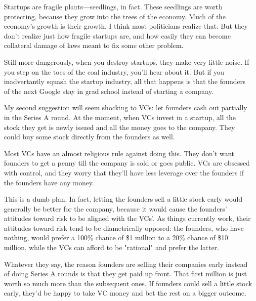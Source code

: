 Startups are
                  fragile plants---seedlings, in fact. These seedlings are
                  worth protecting, because they grow into the trees of the
                  economy. Much of the economy's growth is their growth. I think
                  most politicians realize that. But they don't realize just how
                  fragile startups are, and how easily they can become
                  collateral damage of laws meant to fix some other problem.

Still
                  more dangerously, when you destroy startups, they make very
                  little noise. If you step on the toes of the coal industry,
                  you'll hear about it. But if you inadvertantly squash the
                  startup industry, all that happens is that the founders of the
                  next Google stay in grad school instead of starting a
                  company.

My second suggestion will seem shocking to
                  VCs: let founders cash out partially in the Series A round. At
                  the moment, when VCs invest in a startup, all the stock they
                  get is newly issued and all the money goes to the company.
                  They could buy some stock directly from the founders as
                  well.

Most VCs have an almost religious rule
                  against doing this. They don't want founders to get a penny
                  till the company is sold or goes public. VCs are obsessed with
                  control, and they worry that they'll have less leverage over
                  the founders if the founders have any money.

This
                  is a dumb plan. In fact, letting the founders sell a little
                  stock early would generally be better for the company, because
                  it would cause the founders' attitudes toward risk to be
                  aligned with the VCs'. As things currently work, their
                  attitudes toward risk tend to be diametrically opposed: the
                  founders, who have nothing, would prefer a 100\% chance of \$1
                  million to a 20\% chance of \$10 million, while the VCs can
                  afford to be "rational" and prefer the latter.

Whatever
                  they say, the reason founders are selling their companies
                  early instead of doing Series A rounds is that they get paid
                  up front. That first million is just worth so much more than
                  the subsequent ones. If founders could sell a little stock
                  early, they'd be happy to take VC money and bet the rest on a
                  bigger outcome.


